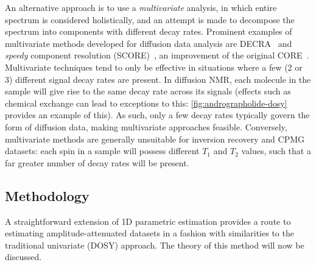 An alternative approach
is to use a \emph{multivariate} analysis, in which entire spectrum is
considered holistically, and an attempt is made to decompose the spectrum into
components with different decay rates. Prominent examples of multivariate methods
developed for diffusion data analysis are \ac{DECRA}~\cite{Windig1998} and
\emph{speedy} component resolution (\acs{SCORE})~\cite{Nilsson2008}, an
improvement of the original \acs{CORE}~\cite{Stilbs1996,Stilbs1996b}.
Multivariate techniques tend to only be effective in situations where a
few (2 or 3) different signal decay rates are present. In diffusion
\ac{NMR}, each molecule in the sample will give rise to the same decay rate
across its signals (effects such as chemical exchange can lead to exceptions to
this: \cref{fig:andrographolide-dosy} provides an example of this). As such,
only a few decay rates typically govern the form of diffusion data, making
multivariate approaches feasible.
Conversely, multivariate methods are generally unsuitable for inversion
recovery and \ac{CPMG} datasets: each spin in a sample will possess different
$T_1$ and $T_2$ values, such that a far greater number of decay rates will be
present.

\subsection{Methodology}
\label{subsec:seq-method}
A straightforward extension of \ac{1D} parametric estimation
provides a route to estimating amplitude-attenuated datasets in a
fashion with similarities to the traditional univariate (\ac{DOSY}) approach.
The theory of this method will now be discussed.

